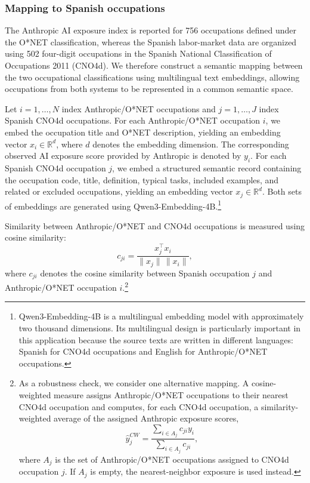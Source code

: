 \subsubsection{Mapping to Spanish occupations}
\label{sec:mapping}

The Anthropic AI exposure index is reported for 756 occupations defined under the O*NET classification, whereas the Spanish labor-market data are organized using 502 four-digit occupations in the Spanish National Classification of Occupations 2011 (CNO4d). We therefore construct a semantic mapping between the two occupational classifications using multilingual text embeddings, allowing occupations from both systems to be represented in a common semantic space.

Let $i=1,\ldots,N$ index Anthropic/O*NET occupations and $j=1,\ldots,J$ index Spanish CNO4d occupations. For each Anthropic/O*NET occupation $i$, we embed the occupation title and O*NET description, yielding an embedding vector $x_i\in\mathbb{R}^d$, where $d$ denotes the embedding dimension. The corresponding observed AI exposure score provided by Anthropic is denoted by $y_i$. For each Spanish CNO4d occupation $j$, we embed a structured semantic record containing the occupation code, title, definition, typical tasks, included examples, and related or excluded occupations, yielding an embedding vector $x_j\in\mathbb{R}^d$. Both sets of embeddings are generated using Qwen3-Embedding-4B.\footnote{Qwen3-Embedding-4B is a multilingual embedding model with approximately two thousand dimensions. Its multilingual design is particularly important in this application because the source texts are written in different languages: Spanish for CNO4d occupations and English for Anthropic/O*NET occupations.}

Similarity between Anthropic/O*NET and CNO4d occupations is measured using cosine similarity:
\[
c_{ji}=\frac{x_j^\top x_i}{\lVert x_j\rVert\,\lVert x_i\rVert},
\]
where $c_{ji}$ denotes the cosine similarity between Spanish occupation $j$ and Anthropic/O*NET occupation $i$.\footnote{As a robustness check, we consider one alternative mapping. A cosine-weighted measure assigns Anthropic/O*NET occupations to their nearest CNO4d occupation and computes, for each CNO4d occupation, a similarity-weighted average of the assigned Anthropic exposure scores,
\[
\widehat{y}^{CW}_j=
\frac{\sum_{i\in A_j}c_{ji}y_i}
{\sum_{i\in A_j}c_{ji}},
\]
where $A_j$ is the set of Anthropic/O*NET occupations assigned to CNO4d occupation $j$. If $A_j$ is empty, the nearest-neighbor exposure is used instead.}

